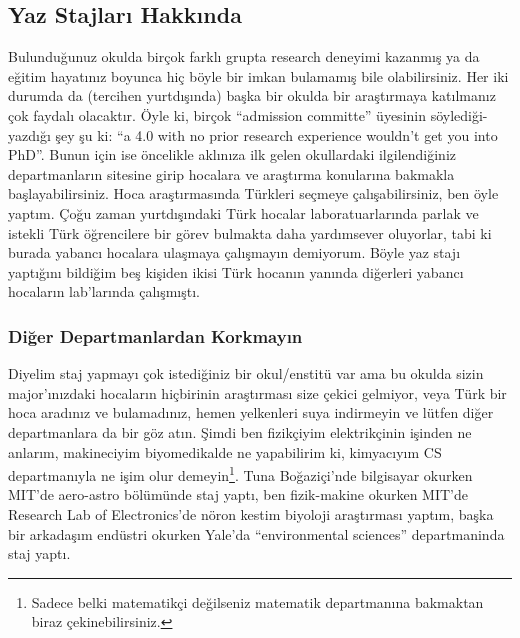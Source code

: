 \documentclass[12pt]{article}
\begin{document}
\subsection{Yaz Stajları Hakkında}
Bulunduğunuz okulda birçok farklı grupta research deneyimi kazanmış ya da eğitim hayatınız boyunca hiç böyle bir imkan bulamamış bile olabilirsiniz. Her iki durumda da (tercihen yurtdışında) başka bir okulda bir araştırmaya katılmanız çok faydalı olacaktır. Öyle ki, birçok “admission committe” üyesinin söylediği-yazdığı şey şu ki: “a 4.0 with no prior research experience wouldn’t get you into PhD”. Bunun için ise öncelikle aklınıza ilk gelen okullardaki ilgilendiğiniz departmanların sitesine girip hocalara ve araştırma konularına bakmakla başlayabilirsiniz. Hoca araştırmasında Türkleri seç\-meye çalışabilirsiniz, ben öyle yaptım. Çoğu zaman yurtdışındaki Türk hocalar laboratuarlarında parlak ve istekli Türk öğrencilere bir görev bulmakta daha yardımsever oluyorlar, tabi ki burada yabancı hocalara ulaşmaya çalışmayın demiyorum. Böyle yaz stajı yaptığını bildiğim beş kişiden ikisi Türk hocanın yanında diğerleri yabancı hocaların lab’larında çalışmıştı. 

\subsubsection{Diğer Departmanlardan Korkmayın}
Diyelim staj yapmayı çok istediğiniz bir okul/enstitü var ama bu okulda sizin major’ınızdaki hocaların hiçbirinin araştırması size çekici gelmiyor, veya Türk bir hoca aradınız ve bulamadınız, hemen yelkenleri suya indirmeyin ve lütfen diğer departmanlara da bir göz atın. Şimdi ben fizikçiyim elektrikçinin işinden ne anlarım, makineciyim biyomedikalde ne yapabilirim ki, kimyacıyım CS departmanıyla ne işim olur demeyin\footnote{Sadece belki matematikçi değilseniz matematik departmanına bakmaktan biraz çekinebilirsiniz.}.  Tuna Boğaziçi’nde bilgisayar okurken MIT’de aero-astro bölümünde staj yaptı, ben fizik-makine okurken MIT’de Research Lab of Electronics’de nöron kestim biyoloji araştırması yaptım, başka bir arkadaşım endüstri okurken Yale’da “environmental sciences” departmaninda staj yaptı.
\end{document}
